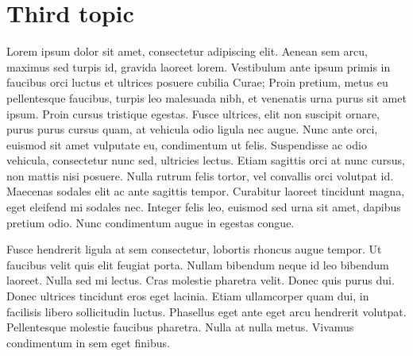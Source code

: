 \section{Third topic} 
Lorem ipsum dolor sit amet, consectetur adipiscing elit. Aenean sem arcu, maximus sed turpis id, gravida laoreet lorem. Vestibulum ante ipsum primis in faucibus orci luctus et ultrices posuere cubilia Curae; Proin pretium, metus eu pellentesque faucibus, turpis leo malesuada nibh, et venenatis urna purus sit amet ipsum. Proin cursus tristique egestas. Fusce ultrices, elit non suscipit ornare, purus purus cursus quam, at vehicula odio ligula nec augue. Nunc ante orci, euismod sit amet vulputate eu, condimentum ut felis. Suspendisse ac odio vehicula, consectetur nunc sed, ultricies lectus. Etiam sagittis orci at nunc cursus, non mattis nisi posuere. Nulla rutrum felis tortor, vel convallis orci volutpat id. Maecenas sodales elit ac ante sagittis tempor. Curabitur laoreet tincidunt magna, eget eleifend mi sodales nec. Integer felis leo, euismod sed urna sit amet, dapibus pretium odio. Nunc condimentum augue in egestas congue.

Fusce hendrerit ligula at sem consectetur, lobortis rhoncus augue tempor. Ut faucibus velit quis elit feugiat porta. Nullam bibendum neque id leo bibendum laoreet. Nulla sed mi lectus. Cras molestie pharetra velit. Donec quis purus dui. Donec ultrices tincidunt eros eget lacinia. Etiam ullamcorper quam dui, in facilisis libero sollicitudin luctus. Phasellus eget ante eget arcu hendrerit volutpat. Pellentesque molestie faucibus pharetra. Nulla at nulla metus. Vivamus condimentum in sem eget finibus.

